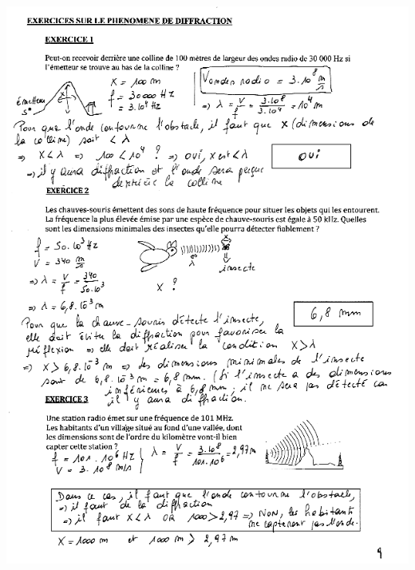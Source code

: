 {{{{{{{{{{\includegraphics[width=18.503cm,height=25.615cm]{Pictures/100000010000026F0000035E638B1FB4AD6FDEB0.png}

}}}}}}}}}}
